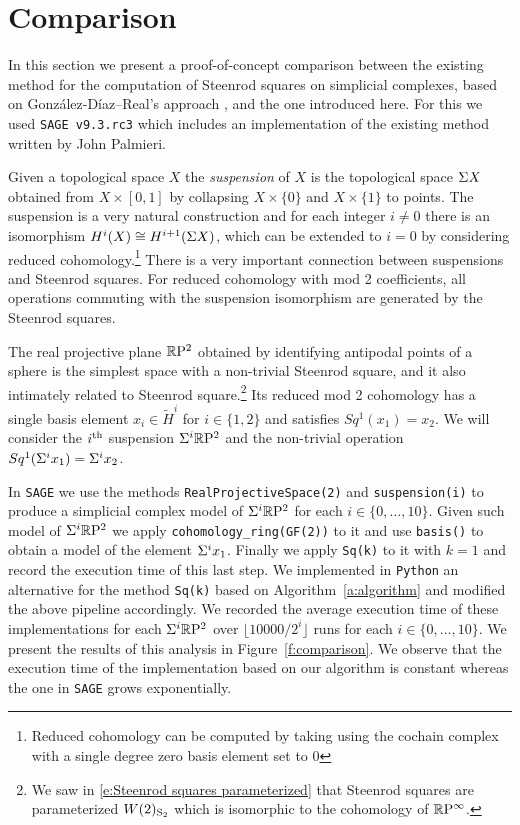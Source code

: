 
\section{Comparison} \label{s:comparison}

In this section we present a proof-of-concept comparison between the existing method for the computation of Steenrod squares on simplicial complexes, based on Gonz\'alez-D\'iaz--Real's approach \cite[Corollary 3.2]{gonzalez1999combinatorial}, and the one introduced here.
For this we used \verb|SAGE v9.3.rc3| which includes an implementation of the existing method written by John Palmieri.

Given a topological space $X$ the \textit{suspension} of $X$ is the topological space $\suspension X$ obtained from $X \times [0,1]$ by collapsing $X \times \{0\}$ and $X \times \{1\}$ to points.
The suspension is a very natural construction and for each integer $i \neq 0$ there is an isomorphism $H^i(X) \cong H^{i+1}(\suspension X)$, which can be extended to $i = 0$ by considering reduced cohomology.\footnote{Reduced cohomology can be computed by taking using the cochain complex with a single degree zero basis element set to $0$}
There is a very important connection between suspensions and Steenrod squares.
For reduced cohomology with mod 2 coefficients, all operations commuting with the suspension isomorphism are generated by the Steenrod squares.

The real projective plane $\RP^2$ obtained by identifying antipodal points of a sphere is the simplest space with a non-trivial Steenrod square, and it also intimately related to Steenrod square.\footnote{We saw in \eqref{e:Steenrod squares parameterized} that Steenrod squares are parameterized $W(2)_{\S_2}$ which is isomorphic to the cohomology of $\RP^\infty$.}
Its reduced mod 2 cohomology has a single basis element $x_i \in \widetilde{H}^i$ for $i \in \{1, 2\}$ and satisfies $Sq^1(x_1) = x_2$.
We will consider the $i\th$ suspension $\suspension^i \RP^2$ and the non-trivial operation $Sq^1(\suspension^i x_1) = \suspension^i x_2$.

In \verb|SAGE| we use the methods \verb|RealProjectiveSpace(2)| and \verb|suspension(i)| to produce a simplicial complex model of $\suspension^i \RP^2$ for each $i \in \{0, \dots, 10\}$.
Given such model of $\suspension^i \RP^2$ we apply \verb|cohomology_ring(GF(2))| to it and use \verb|basis()| to obtain a model of the element $\suspension^i x_1$.
Finally we apply \verb|Sq(k)| to it with $k=1$ and record the execution time of this last step.
We implemented in \verb|Python| an alternative for the method \verb|Sq(k)| based on Algorithm~\ref{a:algorithm} and modified the above pipeline accordingly.
We recorded the average execution time of these implementations for each $\suspension^i \RP^2$ over $\lfloor 10000/2^i \rfloor$ runs for each $i \in \{0, \dots, 10\}$. We present the results of this analysis in Figure~\ref{f:comparison}.
We observe that the execution time of the implementation based on our algorithm is constant whereas the one in \verb|SAGE| grows exponentially.

